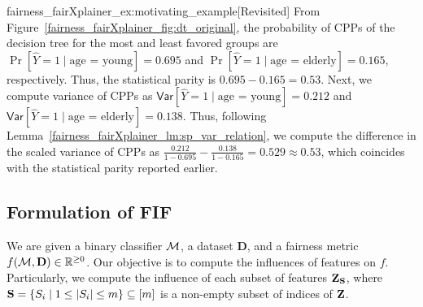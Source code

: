 \begin{repexample}{fairness_fairXplainer_ex:motivating_example}[Revisited]
	From Figure~\ref{fairness_fairXplainer_fig:dt_original}, the probability of CPPs of the decision tree for the most and least favored groups are $  \Pr[\widehat{Y} = 1 \mid \text{age = young}] = 0.695 $ and $ \Pr[\widehat{Y} = 1 \mid \text{age = elderly}] = 0.165 $, respectively. Thus, the statistical parity is $ 0.695 - 0.165 =  0.53 $. Next, we compute variance of CPPs as $  \mathsf{Var}[\widehat{Y} = 1\mid \text{age = young}] = 0.212 $ and $  \mathsf{Var}[\widehat{Y} = 1\mid \text{age = elderly}] = 0.138 $. Thus, following Lemma~\ref{fairness_fairXplainer_lm:sp_var_relation}, we compute the difference in the scaled  variance of CPPs as $ \frac{0.212}{1 - 0.695} - \frac{0.138}{1 - 0.165} =  0.529 \approx 0.53 $, which coincides with the statistical parity reported earlier.
\end{repexample}



\subsection{Formulation of FIF}
\label{fairness_fairXplainer_sec:fif_formulation}
We are given a binary classifier  $\mathcal{M} $, a dataset $ \mathbf{D} $, and a  fairness metric $ f(\mathcal{M}, \mathbf{D}) \in \mathbb{R}^{\geq 0} $. Our objective is to compute the influences of  features on $ f $. Particularly, we compute the influence of each subset of  features $ \mathbf{Z}_{\mathbf{S}} $, where $ \mathbf{S} = \{S_i \mid 1 \le |S_i| \le m\} \subseteq [m]  $ is a non-empty subset of indices of $ \mathbf{Z} $.

